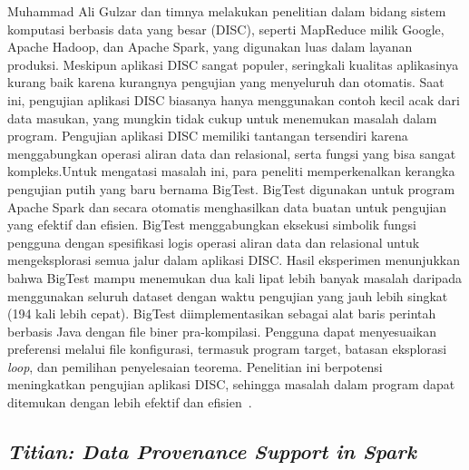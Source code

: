 Muhammad Ali Gulzar dan timnya melakukan penelitian dalam bidang sistem komputasi berbasis data yang besar (DISC), seperti MapReduce milik Google, Apache Hadoop, dan Apache Spark, yang digunakan luas dalam layanan produksi. Meskipun aplikasi DISC sangat populer, seringkali kualitas aplikasinya kurang baik karena kurangnya pengujian yang menyeluruh dan otomatis. Saat ini, pengujian aplikasi DISC biasanya hanya menggunakan contoh kecil acak dari data masukan, yang mungkin tidak cukup untuk menemukan masalah dalam program. Pengujian aplikasi DISC memiliki tantangan tersendiri karena menggabungkan operasi aliran data dan relasional, serta fungsi yang bisa sangat kompleks.Untuk mengatasi masalah ini, para peneliti memperkenalkan kerangka pengujian putih yang baru bernama BigTest. BigTest digunakan untuk program Apache Spark dan secara otomatis menghasilkan data buatan untuk pengujian yang efektif dan efisien. BigTest menggabungkan eksekusi simbolik fungsi pengguna dengan spesifikasi logis operasi aliran data dan relasional untuk mengeksplorasi semua jalur dalam aplikasi DISC. Hasil eksperimen menunjukkan bahwa BigTest mampu menemukan dua kali lipat lebih banyak masalah daripada menggunakan seluruh dataset dengan waktu pengujian yang jauh lebih singkat (194 kali lebih cepat). BigTest diimplementasikan sebagai alat baris perintah berbasis Java dengan file biner pra-kompilasi. Pengguna dapat menyesuaikan preferensi melalui file konfigurasi, termasuk program target, batasan eksplorasi \emph{loop}, dan pemilihan penyelesaian teorema. Penelitian ini berpotensi meningkatkan pengujian aplikasi DISC, sehingga masalah dalam program dapat ditemukan dengan lebih efektif dan efisien~\cite{gulzar2020}.

\subsection{\emph{Titian: Data Provenance Support in Spark}}
\label{subsec:Titian: Data Provenance Support in Spark}

